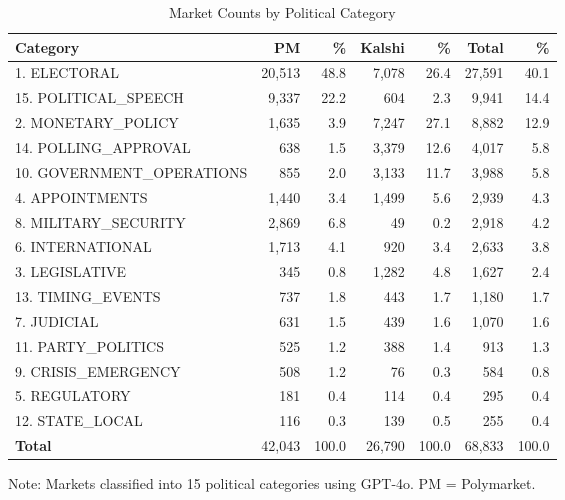 \begin{table}[htbp]
\centering
\caption{Market Counts by Political Category}
\label{tab:market_counts_category}
\footnotesize
\begin{tabular}{lrrrrrr}
\toprule
Category & PM & \% & Kalshi & \% & Total & \% \\
\midrule
1. ELECTORAL & 20,513 & 48.8 & 7,078 & 26.4 & 27,591 & 40.1 \\
15. POLITICAL\_SPEECH & 9,337 & 22.2 & 604 & 2.3 & 9,941 & 14.4 \\
2. MONETARY\_POLICY & 1,635 & 3.9 & 7,247 & 27.1 & 8,882 & 12.9 \\
14. POLLING\_APPROVAL & 638 & 1.5 & 3,379 & 12.6 & 4,017 & 5.8 \\
10. GOVERNMENT\_OPERATIONS & 855 & 2.0 & 3,133 & 11.7 & 3,988 & 5.8 \\
4. APPOINTMENTS & 1,440 & 3.4 & 1,499 & 5.6 & 2,939 & 4.3 \\
8. MILITARY\_SECURITY & 2,869 & 6.8 & 49 & 0.2 & 2,918 & 4.2 \\
6. INTERNATIONAL & 1,713 & 4.1 & 920 & 3.4 & 2,633 & 3.8 \\
3. LEGISLATIVE & 345 & 0.8 & 1,282 & 4.8 & 1,627 & 2.4 \\
13. TIMING\_EVENTS & 737 & 1.8 & 443 & 1.7 & 1,180 & 1.7 \\
7. JUDICIAL & 631 & 1.5 & 439 & 1.6 & 1,070 & 1.6 \\
11. PARTY\_POLITICS & 525 & 1.2 & 388 & 1.4 & 913 & 1.3 \\
9. CRISIS\_EMERGENCY & 508 & 1.2 & 76 & 0.3 & 584 & 0.8 \\
5. REGULATORY & 181 & 0.4 & 114 & 0.4 & 295 & 0.4 \\
12. STATE\_LOCAL & 116 & 0.3 & 139 & 0.5 & 255 & 0.4 \\
\midrule
\textbf{Total} & 42,043 & 100.0 & 26,790 & 100.0 & 68,833 & 100.0 \\
\bottomrule
\end{tabular}
\begin{tablenotes}
\small
\item Note: Markets classified into 15 political categories using GPT-4o. PM = Polymarket.
\end{tablenotes}
\end{table}
